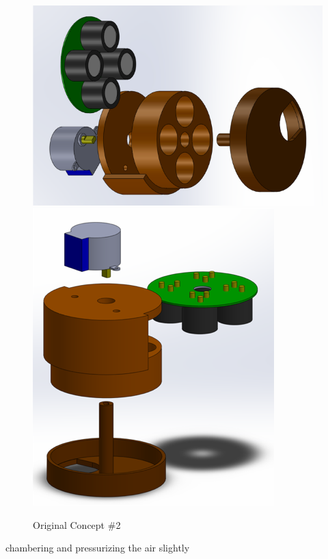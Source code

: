 \begin{figure}[htb]
 	\includegraphics[width=\textwidth/2]{visuals/prevwork2a}    
 	\includegraphics[width=\textwidth/2]{visuals/prevwork2b}            
 	 \caption{Original Concept \#2}
  	\label{fig:prevwork1a}
\end{figure}

chambering and pressurizing the air slightly 

\clearpage
\newpage

